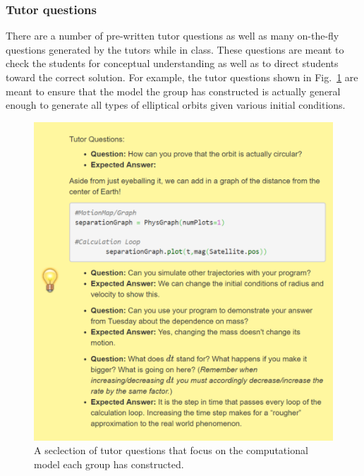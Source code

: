 \documentclass{msuphddissertation}
\begin{document}
\begin{doublespace}
\subsubsection{Tutor questions}\label{CH3:TutorQuestions}

There are a number of pre-written tutor questions as well as many on-the-fly questions generated by the tutors while in class.  These questions are meant to check the students for conceptual understanding as well as to direct students toward the correct solution.  For example, the tutor questions shown in Fig.~\ref{CH3:TutorQuestion} are meant to ensure that the model the group has constructed is actually general enough to generate all types of elliptical orbits given various initial conditions.

\begin{figure}[ht]\centering
\includegraphics[scale=0.5]{images/CH3TutorQuestion.pdf}
\caption{A seclection of tutor questions that focus on the computational model each group has constructed.}\label{CH3:TutorQuestion}
\end{figure}


\end{doublespace}
\end{document}
